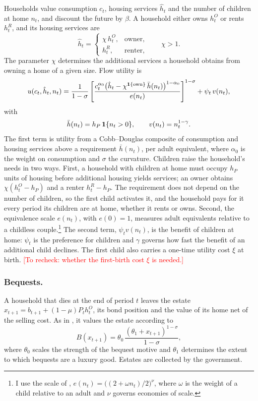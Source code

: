 Households value consumption $c_t$, housing services $\hat h_t$ and the
number of children at home $n_t$, and discount the future by $\beta$. A
household either owns $h^O_t$ or rents $h^R_t$, and its housing services are
\begin{equation*}
 \hat h_t=\begin{cases}\chi\,h^O_t, & \text{owner},\\ h^R_t, & \text{renter},\end{cases}
 \qquad \chi>1 .
\end{equation*}
The parameter $\chi$ determines the additional services a household obtains
from owning a home of a given size. Flow utility is
\begin{equation}
 u(c_t,\hat h_t,n_t)=\frac{1}{1-\sigma}\left[\frac{c_t^{\alpha_0}\bigl(\hat h_t-\chi^{\mathbf 1\{\text{own}\}}\,\bar h(n_t)\bigr)^{1-\alpha_0}}{e(n_t)}\right]^{1-\sigma}+\psi_t\,v(n_t),
 \label{eq:m-utility}
\end{equation}
with
\begin{equation*}
 \bar h(n_t)=h_P\,\mathbf 1\{n_t>0\},\qquad v(n_t)=n_t^{1-\gamma}.
\end{equation*}
The first term is utility from a Cobb--Douglas composite of consumption and
housing services above a requirement $\bar h(n_t)$, per adult equivalent,
where $\alpha_0$ is the weight on consumption and $\sigma$ the curvature.
Children raise the household's needs in two ways. First, a household with
children at home must occupy $h_P$ units of housing before additional housing
yields services; an owner obtains $\chi(h^O_t-h_P)$ and a renter $h^R_t-h_P$.
The requirement does not depend on the number of children, so the first
child activates it, and the household pays for it every period its children
are at home, whether it rents or owns. Second, the equivalence scale
$e(n_t)$, with $e(0)=1$, measures adult equivalents relative to a childless
couple.\footnote{I use the scale of
\citet{scholzSeshadriKhitatrakunSaving2006},
$e(n_t)=\bigl((2+\omega n_t)/2\bigr)^{\nu}$, where $\omega$ is the weight of
a child relative to an adult and $\nu$ governs economies of scale.} The second
term, $\psi_t v(n_t)$, is the benefit of children at home: $\psi_t$ is the
preference for children and $\gamma$ governs how fast the benefit of an
additional child declines. The first child also carries a one-time utility
cost $\xi$ at birth. \textcolor{red}{[To recheck: whether the first-birth
cost $\xi$ is needed.]}

\subsubsection*{Bequests.}
A household that dies at the end of period $t$ leaves the estate
$x_{t+1}=b_{t+1}+(1-\mu)P_th^O_t$, its bond position and the value of its
home net of the selling cost. As in \citet{deNardiWealthInequality2004}, it
values the estate according to
\begin{equation*}
 B(x_{t+1})=\theta_0\,\frac{(\theta_1+x_{t+1})^{1-\sigma}}{1-\sigma},
\end{equation*}
where $\theta_0$ scales the strength of the bequest motive and $\theta_1$
determines the extent to which bequests are a luxury good. Estates are
collected by the government.

